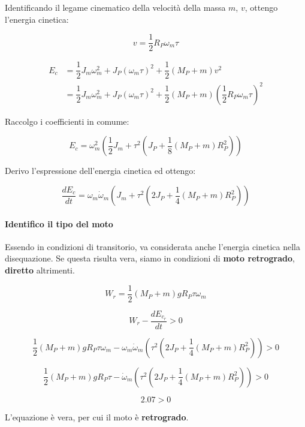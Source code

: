 \documentclass[main.tex]{subfiles}
\begin{document}
Identificando il legame cinematico della velocità della massa $m$, $v$, ottengo l'energia cinetica:

\[
	v = \dfrac{1}{2}R_P\omega_m\tau
\]

\begin{align*}
	E_c &= \dfrac{1}{2}J_m\omega_m^2 + J_P(\omega_m\tau)^2 + \dfrac{1}{2}(M_P + m)v^2 \\
	&=  \dfrac{1}{2}J_m\omega_m^2 + J_P(\omega_m\tau)^2 + \dfrac{1}{2}(M_P + m)(\dfrac{1}{2}R_P\omega_m\tau)^2
\end{align*}

Raccolgo i coefficienti in comume:

\[
	 E_c = \omega_m^2(\dfrac{1}{2}J_m + \tau^2(J_P + \dfrac{1}{8}(M_P + m)R_P^2))
\]

Derivo l'espressione dell'energia cinetica ed ottengo:

\[
	 \dfrac{dE_c}{dt} = \omega_m\dot{\omega}_m(J_m + \tau^2(2J_P + \dfrac{1}{4}(M_P + m)R_P^2))
\]

\paragraph{Identifico il tipo del moto} Essendo in condizioni di transitorio, va considerata anche l'energia cinetica nella disequazione. Se questa risulta vera, siamo in condizioni di \textbf{moto retrogrado}, \textbf{diretto} altrimenti.

\begin{center}
\end{center}

\[
	W_r = \dfrac{1}{2}(M_P + m)gR_P\tau\omega_m
\]

\[
	W_r - \dfrac{dE_{c_r}}{dt} > 0
\]

\[
	\dfrac{1}{2}(M_P + m)gR_P\tau\omega_m - \omega_m\dot{\omega}_m(\tau^2(2J_P + \dfrac{1}{4}(M_P + m)R_P^2)) > 0
\]

\[
	\dfrac{1}{2}(M_P + m)gR_P\tau - \dot{\omega}_m(\tau^2(2J_P + \dfrac{1}{4}(M_P + m)R_P^2)) > 0
\]

\[
	2.07 > 0
\]

L'equazione è vera, per cui il moto è \textbf{retrogrado}.
\end{document}
